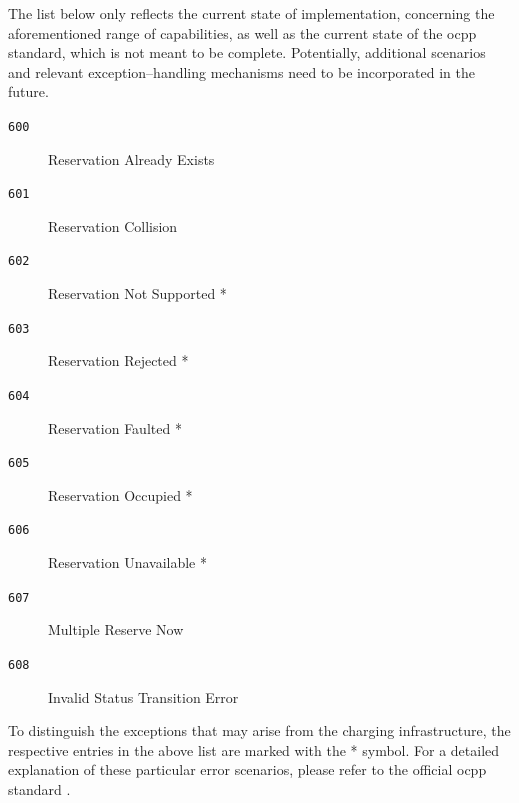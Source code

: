 \noindent The list below only reflects the current state of implementation, concerning the aforementioned range of capabilities, as well as the current state of the \acrshort{ocpp} standard, which is not meant to be complete. Potentially, additional scenarios and relevant exception--handling mechanisms need to be incorporated in the future.

\begin{multicols}{2}
\begin{description}
    \item[\texttt{600}] Reservation Already Exists
    \item[\texttt{601}] Reservation Collision
    \item[\texttt{602}] Reservation Not Supported *
    \item[\texttt{603}] Reservation Rejected *
    \item[\texttt{604}] Reservation Faulted *
\end{description}
\begin{description}
    \item[\texttt{605}] Reservation Occupied *
    \item[\texttt{606}] Reservation Unavailable *
    \item[\texttt{607}] Multiple Reserve Now
    \item[\texttt{608}] Invalid Status Transition Error
\end{description}
\end{multicols}

\noindent To distinguish the exceptions that may arise from the charging infrastructure, the respective entries in the above list are marked with the * symbol. For a detailed explanation of these particular error scenarios, please refer to the official \acrshort{ocpp} standard \cite{noauthor_ocpp_nodate}.
